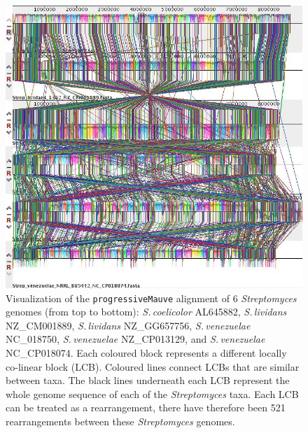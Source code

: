 \documentclass[11pt]{article}
\newcommand{\strep}{\textit{Streptomyces}\xspace}
\newcommand{\p}{\texttt{progressiveMauve}\xspace}
\newcommand{\sliv}{\textit{S.\,lividans}\xspace}
\newcommand{\sven}{\textit{S.\,venezuelae}\xspace}
\newcommand{\scoe}{\textit{S.\,coelicolor}\xspace}
\begin{document}
\newpage
	\begin{figure}[H]
	\begin{center}
		\includegraphics[width=\textwidth]{./figs/6_strep_strains_mauve_aln_pic}
		\caption{\label{fig:strep6mauvealn} Visualization of the \p alignment of 6 \strep genomes (from top to bottom): \scoe AL645882, \sliv NZ\_CM001889, \sliv NZ\_GG657756, \sven NC\_018750, \sven NZ\_CP013129, and \sven NC\_CP018074. Each coloured block represents a different locally co-linear block (LCB). Coloured lines connect LCBs that are similar between taxa. The black lines underneath each LCB represent the whole genome sequence of each of the \strep taxa. Each LCB can be treated as a rearrangement, there have therefore been 521 rearrangements between these \strep genomes.}
	\end{center}
\end{figure}
\end{document}
